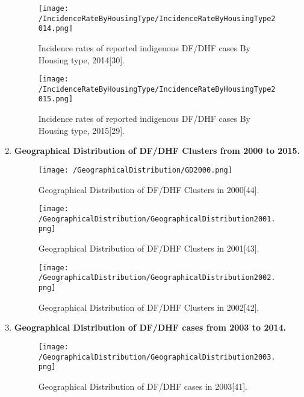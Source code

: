 \documentclass[11pt]{exam}
\begin{document}
\begin{questions}
\begin{enumerate}
\begin{figure}[H]
  \centering
   \texttt{[image: /IncidenceRateByHousingType/IncidenceRateByHousingType2014.png]} 
  \caption{Incidence rates of reported indigenous DF/DHF cases By Housing type, 2014[30].}
   \label{Incidence rate of indigenous DF/DHF cases by housing type.}
\end{figure} 

\begin{figure}[H]
  \centering
   \texttt{[image: /IncidenceRateByHousingType/IncidenceRateByHousingType2015.png]} 
  \caption{Incidence rates of reported indigenous DF/DHF cases By Housing type, 2015[29].}
   \label{Incidence rate of indigenous DF/DHF cases by housing type.}
\end{figure} 

\newpage
\item \textbf{Geographical Distribution of DF/DHF Clusters from 2000 to 2015.}
\begin{figure}[H]
  \centering
   \texttt{[image: /GeographicalDistribution/GD2000.png]} 
  \caption{Geographical Distribution of DF/DHF Clusters in 2000[44].}
   \label{Geographical Distribution of DF/DHF Clusters}
\end{figure} 


\begin{figure}[H]
  \centering
   \texttt{[image: /GeographicalDistribution/GeographicalDistribution2001.png]} 
  \caption{Geographical Distribution of DF/DHF Clusters in 2001[43].}
   \label{Geographical Distribution of DF/DHF Clusters}
\end{figure} 


\begin{figure}[H]
  \centering
   \texttt{[image: /GeographicalDistribution/GeographicalDistribution2002.png]} 
  \caption{Geographical Distribution of DF/DHF Clusters in 2002[42].}
   \label{Geographical Distribution of DF/DHF Clusters}
\end{figure} 

\newpage
\item \textbf{Geographical Distribution of DF/DHF cases from 2003 to 2014.}
\begin{figure}[H]
  \centering
   \texttt{[image: /GeographicalDistribution/GeographicalDistribution2003.png]} 
  \caption{Geographical Distribution of DF/DHF cases in 2003[41].}
   \label{Geographical Distribution of DF/DHF Clusters}
\end{figure} 



\end{enumerate}
\end{questions}
\end{document}
